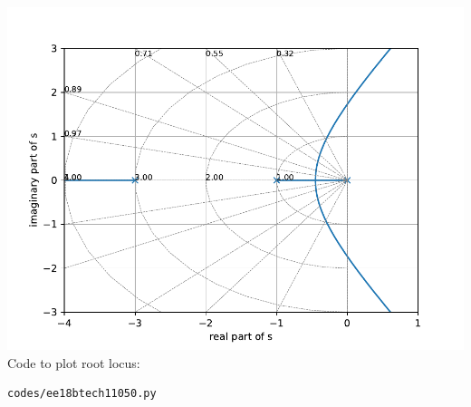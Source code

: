 \begin{enumerate}[label=\thesection.\arabic*.,ref=\thesection.\theenumi]
	\includegraphics[width=\columnwidth]{./figs/ee18btech11050.pdf}
Code to plot root locus:
\begin{lstlisting}
codes/ee18btech11050.py
\end{lstlisting}    

\end{enumerate}
